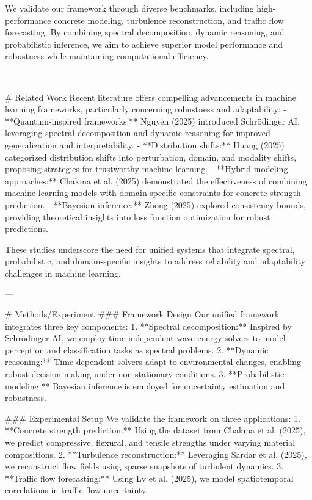 We validate our framework through diverse benchmarks, including high-performance concrete modeling, turbulence reconstruction, and traffic flow forecasting. By combining spectral decomposition, dynamic reasoning, and probabilistic inference, we aim to achieve superior model performance and robustness while maintaining computational efficiency.

---

# Related Work  
Recent literature offers compelling advancements in machine learning frameworks, particularly concerning robustness and adaptability:
- **Quantum-inspired frameworks:** Nguyen (2025) introduced Schrödinger AI, leveraging spectral decomposition and dynamic reasoning for improved generalization and interpretability.
- **Distribution shifts:** Huang (2025) categorized distribution shifts into perturbation, domain, and modality shifts, proposing strategies for trustworthy machine learning.
- **Hybrid modeling approaches:** Chakma et al. (2025) demonstrated the effectiveness of combining machine learning models with domain-specific constraints for concrete strength prediction.
- **Bayesian inference:** Zhong (2025) explored consistency bounds, providing theoretical insights into loss function optimization for robust predictions.

These studies underscore the need for unified systems that integrate spectral, probabilistic, and domain-specific insights to address reliability and adaptability challenges in machine learning.

---

# Methods/Experiment  
### Framework Design  
Our unified framework integrates three key components:
1. **Spectral decomposition:** Inspired by Schrödinger AI, we employ time-independent wave-energy solvers to model perception and classification tasks as spectral problems.
2. **Dynamic reasoning:** Time-dependent solvers adapt to environmental changes, enabling robust decision-making under non-stationary conditions.
3. **Probabilistic modeling:** Bayesian inference is employed for uncertainty estimation and robustness.

### Experimental Setup  
We validate the framework on three applications:
1. **Concrete strength prediction:** Using the dataset from Chakma et al. (2025), we predict compressive, flexural, and tensile strengths under varying material compositions.
2. **Turbulence reconstruction:** Leveraging Sardar et al. (2025), we reconstruct flow fields using sparse snapshots of turbulent dynamics.
3. **Traffic flow forecasting:** Using Lv et al. (2025), we model spatiotemporal correlations in traffic flow uncertainty.

